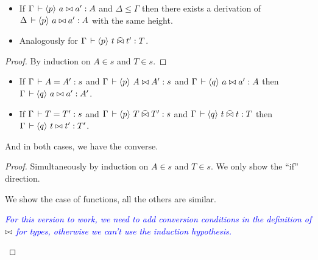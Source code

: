 \documentclass[a4paper,english]{lipics-utf8x}
\newcommand\meta[1]{\noindent\textcolor{blue}{\emph{#1}}}
\begin{document}
  \begin{lemma}[Weakening]
    \leavevmode
    \begin{itemize}
      \item If $\Gamma \,\vdash \langle p \rangle~ a \mathrel{\bowtie} a' : A$ and $\Delta \le \Gamma$ then
      there exists a derivation of $\Delta \,\vdash \langle p \rangle~ a \mathrel{\bowtie} a' : A$ with the
      same height.
      \item Analogously for $\Gamma \,\vdash \langle p \rangle~ t \mathrel{\widehat{\bowtie}} t' : T$.
    \end{itemize}
  \end{lemma}
  \begin{proof}
    By induction on $A \in s$ and $T \in s$.
  \end{proof}

  \begin{lemma}
    \label{lem:s-conv}
    \leavevmode
    \begin{itemize}
      \item If $\Gamma \,\vdash A = A' : s$ and
      $\Gamma \,\vdash \langle p \rangle~ A \mathrel{\bowtie} A' : s$ and
      $\Gamma \,\vdash \langle q \rangle~ a \mathrel{\bowtie} a' : A$ then
      $\Gamma \,\vdash \langle q \rangle~ a \mathrel{\bowtie} a' : A'$.
      \item If $\Gamma \,\vdash T = T' : s$ and
      $\Gamma \,\vdash \langle p \rangle~ T \mathrel{\widehat{\bowtie}} T' : s$ and
      $\Gamma \,\vdash \langle q \rangle~ t \mathrel{\widehat{\bowtie}} t : T$ then
      $\Gamma \,\vdash \langle q \rangle~ t \mathrel{\bowtie} t' : T'$.
    \end{itemize}
    And in both cases, we have the converse.
  \end{lemma}

  \begin{proof}
    Simultaneously by induction on $A \in s$ and $T \in s$.
    We only show the ``if'' direction.

    We show the case of functions, all the others are similar.

    \begin{caselist}
      \nextcase
      \begin{mathc}
      \end{mathc}
      \begin{mathc}
      \end{mathc}
      \meta{For this version to work, we need to add conversion conditions in
      the definition of $\mathrel{\bowtie}$ for types, otherwise we can't use the induction
      hypothesis.}
    \end{caselist}
  \end{proof}
\end{document}
